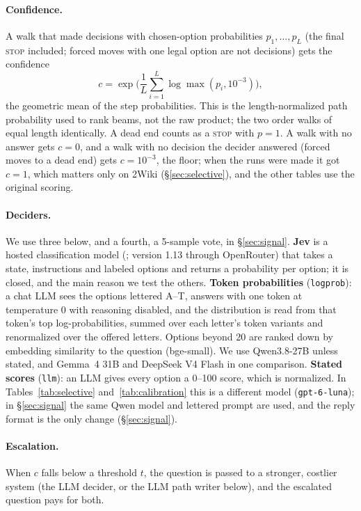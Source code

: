 \documentclass[11pt]{article}
\newcommand{\stopop}{\textsc{stop}}
\begin{document}
\paragraph{Confidence.} A walk that made decisions with chosen-option probabilities
$p_1, \dots, p_L$ (the final \stopop{} included; forced moves with one legal option are
not decisions) gets the confidence
\begin{equation}
  c = \exp\Big(\frac{1}{L}\sum_{i=1}^{L} \log \max(p_i, 10^{-3})\Big),
\end{equation}
the geometric mean of the step probabilities. This is the length-normalized path
probability used to rank beams, not the raw product; the two order walks of equal
length identically. A dead end counts as a \stopop{} with $p = 1$. A walk with no answer
gets $c = 0$, and a walk with no decision the decider answered (forced moves to a dead
end) gets $c = 10^{-3}$, the floor; when the runs were made it got $c = 1$, which matters
only on 2Wiki (\S\ref{sec:selective}), and the other tables use the original scoring.

\paragraph{Deciders.} We use three below, and a fourth, a 5-sample vote, in \S\ref{sec:signal}.
\textbf{Jev} is a hosted classification model (\citealp{jev}; version 1.13 through
OpenRouter) that takes a state, instructions and labeled options and returns a
probability per option; it is closed, and the main reason we test the others.
\textbf{Token probabilities} (\texttt{logprob}): a chat LLM sees the options lettered
A--T, answers with one token at temperature 0 with reasoning disabled, and the
distribution is read from that token's top log-probabilities, summed over each
letter's token variants and renormalized over the offered letters. Options beyond 20 are
ranked down by embedding similarity to the question (bge-small). We use Qwen3.8-27B
unless stated, and Gemma~4 31B and DeepSeek V4 Flash in one comparison.
\textbf{Stated scores} (\texttt{llm}): an LLM gives every option a 0--100 score, which
is normalized. In Tables~\ref{tab:selective} and~\ref{tab:calibration} this is a different model
(\texttt{gpt-6-luna}); in \S\ref{sec:signal} the same
Qwen model and lettered prompt are used, and the reply format is the only change
(\S\ref{sec:signal}).

\paragraph{Escalation.} When $c$ falls below a threshold $t$, the question is passed to
a stronger, costlier system (the LLM decider, or the LLM path writer below), and the
escalated question pays for both.
\end{document}

